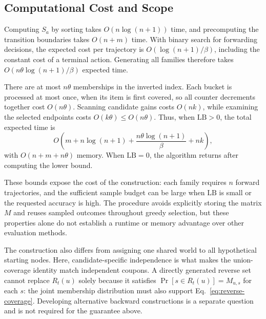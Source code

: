 \subsection{Computational Cost and Scope}
\label{sec:discussion-sampling}

Computing $S_a$ by sorting takes $O(n\log(n+1))$ time, and
precomputing the transition boundaries takes $O(n+m)$ time.
With binary search for forwarding decisions, the expected cost
per trajectory is $O(\log(n+1)/\beta)$, including the constant
cost of a terminal action. Generating all families therefore
takes $O(n\theta\log(n+1)/\beta)$ expected time.

There are at most $n\theta$ memberships in the inverted index.
Each bucket is processed at most once, when its item is first
covered, so all counter decrements together cost $O(n\theta)$.
Scanning candidate gains costs $O(nk)$, while examining the
selected endpoints costs $O(k\theta)\le O(n\theta)$.
Thus, when $\mathrm{LB}>0$, the total expected time is
\begin{equation}
\label{eq:total-complexity}
 O\left(m+n\log(n+1)+\frac{n\theta\log(n+1)}{\beta}+nk\right),
\end{equation}
with $O(n+m+n\theta)$ memory. When $\mathrm{LB}=0$, the algorithm
returns after computing the lower bound.

These bounds expose the cost of the construction: each family
requires $n$ forward trajectories, and the sufficient sample
budget can be large when $\mathrm{LB}$ is small or the requested
accuracy is high. The procedure avoids explicitly storing the
matrix $M$ and reuses sampled outcomes throughout greedy selection,
but these properties alone do not establish a runtime or memory
advantage over other evaluation methods.

The construction also differs from assigning one shared world
to all hypothetical starting nodes. Here, candidate-specific
independence is what makes the union-coverage identity match
independent coupons. A directly generated reverse set cannot
replace $R_t(u)$ solely because it satisfies
$\Pr[s\in R_t(u)]=M_{u,s}$ for each $s$: the joint membership
distribution must also support Eq.~\eqref{eq:reverse-coverage}.
Developing alternative backward constructions is a separate
question and is not required for the guarantee above.
